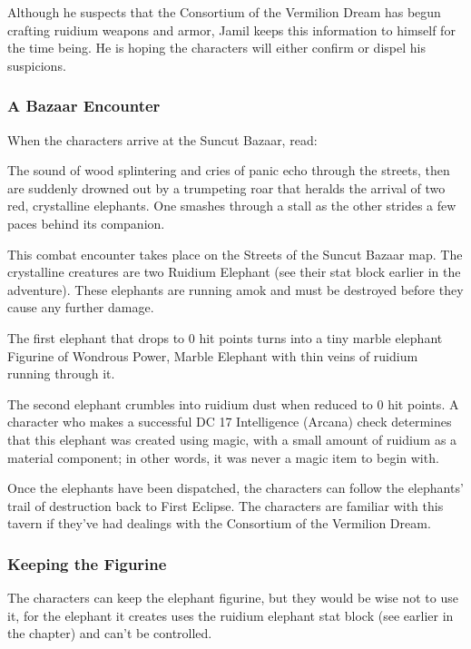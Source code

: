 \documentclass[10pt,a4paper,twoside,bg=print,twocolumn,openany,nodeprecatedcode]{dndbook}
\begin{document}
Although he suspects that the Consortium of the Vermilion Dream has begun crafting ruidium weapons and armor, Jamil keeps this information to himself for the time being. He is hoping the characters will either confirm or dispel his suspicions.

\subsubsection{A Bazaar Encounter}
When the characters arrive at the Suncut Bazaar, read:

\begin{DndReadAloud}{}
The sound of wood splintering and cries of panic echo through the streets, then are suddenly drowned out by a trumpeting roar that heralds the arrival of two red, crystalline elephants. One smashes through a stall as the other strides a few paces behind its companion.

\end{DndReadAloud}

This combat encounter takes place on the Streets of the Suncut Bazaar map. The crystalline creatures are two Ruidium Elephant (see their stat block earlier in the adventure). These elephants are running amok and must be destroyed before they cause any further damage.

The first elephant that drops to 0 hit points turns into a tiny marble elephant Figurine of Wondrous Power, Marble Elephant with thin veins of ruidium running through it.

The second elephant crumbles into ruidium dust when reduced to 0 hit points. A character who makes a successful DC 17 Intelligence (Arcana) check determines that this elephant was created using magic, with a small amount of ruidium as a material component; in other words, it was never a magic item to begin with.

Once the elephants have been dispatched, the characters can follow the elephants' trail of destruction back to First Eclipse. The characters are familiar with this tavern if they've had dealings with the Consortium of the Vermilion Dream.

\subsubsection{Keeping the Figurine}
The characters can keep the elephant figurine, but they would be wise not to use it, for the elephant it creates uses the ruidium elephant stat block (see earlier in the chapter) and can't be controlled.
\end{document}
